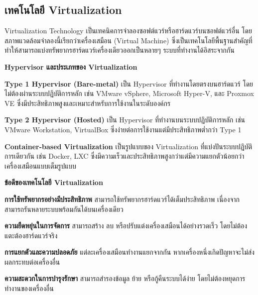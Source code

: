 \subsection{เทคโนโลยี Virtualization}

\hspace*{1.5em} %
Virtualization Technology เป็นเทคนิคการจำลองซอฟต์แวร์หรือฮาร์ดแวร์บนซอฟต์แวร์อื่น โดยสภาพแวดล้อมจำลองนี้เรียกว่าเครื่องเสมือน (Virtual Machine) ซึ่งเป็นเทคโนโลยีพื้นฐานสำคัญที่ทำให้สามารถแบ่งทรัพยากรฮาร์ดแวร์เครื่องเดียวออกเป็นหลายๆ ระบบที่ทำงานได้อิสระจากกัน \parencite{garcia2023hypervisor}

\hspace*{1.5em} %
\textbf{Hypervisor และประเภทของ Virtualization}
\begin{mycustomitem}
    \item \textbf{Type 1 Hypervisor (Bare-metal)} เป็น Hypervisor ที่ทำงานโดยตรงบนฮาร์ดแวร์ โดยไม่ต้องผ่านระบบปฏิบัติการหลัก เช่น VMware vSphere, Microsoft Hyper-V, และ Proxmox VE ซึ่งมีประสิทธิภาพสูงและเหมาะสำหรับการใช้งานในระดับองค์กร
    \item \textbf{Type 2 Hypervisor (Hosted)} เป็น Hypervisor ที่ทำงานบนระบบปฏิบัติการหลัก เช่น VMware Workstation, VirtualBox ซึ่งง่ายต่อการใช้งานแต่มีประสิทธิภาพต่ำกว่า Type 1
    \item \textbf{Container-based Virtualization} เป็นรูปแบบของ Virtualization ที่แบ่งปันระบบปฏิบัติการเดียวกัน เช่น Docker, LXC ซึ่งมีความเร็วและประสิทธิภาพสูงกว่าแต่มีความแยกตัวน้อยกว่าเครื่องเสมือนแบบเต็มรูปแบบ
\end{mycustomitem}

\hspace*{1.5em} %
\textbf{ข้อดีของเทคโนโลยี Virtualization}
\begin{mycustomitem}
    \item \textbf{การใช้ทรัพยากรอย่างมีประสิทธิภาพ} สามารถใช้ทรัพยากรฮาร์ดแวร์ได้เต็มประสิทธิภาพ เนื่องจากสามารถรันหลายระบบพร้อมกันได้บนเครื่องเดียว
    \item \textbf{ความยืดหยุ่นในการจัดการ} สามารถสร้าง ลบ หรือปรับแต่งเครื่องเสมือนได้อย่างรวดเร็ว โดยไม่ต้องแตะต้องฮาร์ดแวร์จริง
    \item \textbf{การแยกตัวและความปลอดภัย} แต่ละเครื่องเสมือนทำงานแยกจากกัน หากเครื่องหนึ่งเกิดปัญหาจะไม่ส่งผลกระทบต่อเครื่องอื่น
    \item \textbf{ความสะดวกในการบำรุงรักษา} สามารถสำรองข้อมูล ย้าย หรือกู้คืนระบบได้ง่าย โดยไม่ต้องหยุดการทำงานของเครื่องอื่น
\end{mycustomitem}


